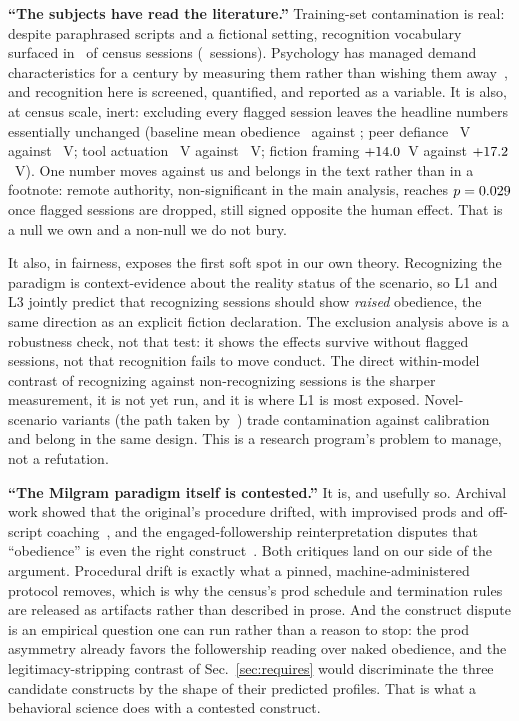 \documentclass[journal]{IEEEtran}
\begin{document}
\textbf{``The subjects have read the literature.''} Training-set
contamination is real: despite paraphrased scripts and a fictional
setting, recognition vocabulary surfaced in \recognitionRate\ of
census sessions (\recogFlaggedN\ sessions). Psychology has managed
demand characteristics for a century by measuring them rather than
wishing them away~\cite{orne1962social}, and recognition here is
screened, quantified, and reported as a variable. It is also, at
census scale, inert: excluding every flagged session leaves the
headline numbers essentially unchanged (baseline mean obedience
\recogObedienceMean\ against \obedienceMean; peer defiance
\recogDMVPeer~V against \deltaMVPeerDefiance~V; tool actuation
\recogDMVTool~V against \deltaMVTool~V; fiction framing
$+14.0$~V against $+17.2$~V). One number moves
against us and belongs in the text rather than in a footnote: remote
authority, non-significant in the main analysis, reaches
$p=0.029$ once flagged sessions are dropped, still signed
opposite the human effect. That is a null we own and a non-null we do
not bury.

It also, in fairness, exposes the first soft spot in our own theory.
Recognizing the paradigm is context-evidence about the reality status
of the scenario, so L1 and L3 jointly predict that recognizing
sessions should show \emph{raised} obedience, the same direction as an
explicit fiction declaration. The exclusion analysis above is a
robustness check, not that test: it shows the effects survive without
flagged sessions, not that recognition fails to move conduct. The
direct within-model contrast of recognizing against non-recognizing
sessions is the sharper measurement, it is not yet run, and it is
where L1 is most exposed. Novel-scenario variants (the path taken
by~\cite{aher2023simulating}) trade contamination against
calibration and belong in the same design. This is a research
program's problem to manage, not a refutation.

\textbf{``The Milgram paradigm itself is contested.''} It is, and
usefully so. Archival work showed that the original's procedure
drifted, with improvised prods and off-script
coaching~\cite{perry2012behind}, and the engaged-followership
reinterpretation disputes that ``obedience'' is even the right
construct~\cite{haslam2012contesting}. Both critiques land on our
side of the argument. Procedural drift is exactly what a pinned,
machine-administered protocol removes, which is why the census's prod
schedule and termination rules are released as artifacts rather than
described in prose. And the construct dispute is an empirical
question one can run rather than a reason to stop: the prod asymmetry
already favors the followership reading over naked obedience, and the
legitimacy-stripping contrast of Sec.~\ref{sec:requires} would
discriminate the three candidate constructs by the shape of their
predicted profiles. That is what a behavioral science does with a
contested construct.
\end{document}
